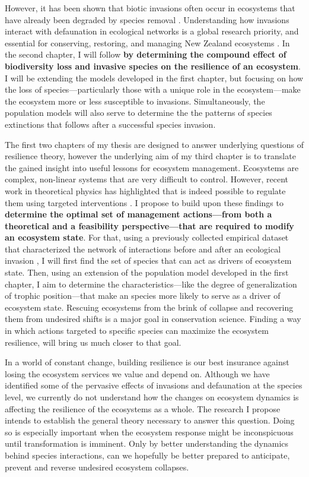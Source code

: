\documentclass[a4paper]{article}
\begin{document}
However, it has been shown that biotic invasions often occur in ecosystems that have already been degraded by species removal \cite{Bennett2015}.
Understanding how invasions interact with defaunation in ecological networks is a global research priority, and essential for conserving, restoring, and managing New Zealand ecosystems \cite{Newstrom2005}.
In the second chapter, I will follow \textbf{by determining the compound effect of biodiversity loss and invasive species on the resilience of an ecosystem}.
I will be extending the models developed in the first chapter, but focusing on how the loss of species---particularly those with a unique role in the ecosystem---make the ecosystem more or less susceptible to invasions.
Simultaneously, the population models will also serve to determine the the patterns of species extinctions that follows after a successful species invasion.

The first two chapters of my thesis are designed to answer underlying questions of resilience theory, however the underlying aim of my third chapter is to translate the gained insight into useful lessons for ecosystem management.
Ecosystems are complex, non-linear systems that are very difficult to control.
However, recent work in theoretical physics has highlighted that is indeed possible to regulate them using targeted interventions \cite{Cornelius2013}.
I propose to build upon these findings to \textbf{determine the optimal set of management actions---from both a theoretical and a feasibility perspective---that are required to modify an ecosystem state}.
For that, using a previously collected empirical dataset that characterized the network of interactions before and after an ecological invasion \cite{Bartomeus2008}, I will first find the set of species that can act as drivers of ecosystem state.
Then, using an extension of the population model developed in the first chapter, I aim to determine the characteristics---like the degree of generalization of trophic position---that make an species more likely to serve as a driver of ecosystem state.
Rescuing ecosystems from the brink of collapse and recovering them from undesired shifts is a major goal in conservation science.
Finding a way in which actions targeted to specific species can maximize the ecosystem resilience, will bring us much closer to that goal.

In a world of constant change, building resilience is our best insurance against losing the ecosystem services we value and depend on.
Although we have identified some of the pervasive effects of invasions and defaunation at the species level, we currently do not understand how the changes on ecosystem dynamics is affecting the resilience of the ecosystems as a whole.
The research I propose intends to establish the general theory necessary to answer this question.
Doing so is especially important when the ecosystem response might be inconspicuous until transformation is imminent.
Only by better understanding the dynamics behind species interactions, can we hopefully be better prepared to anticipate, prevent and reverse undesired ecosystem collapses.
\end{document}
